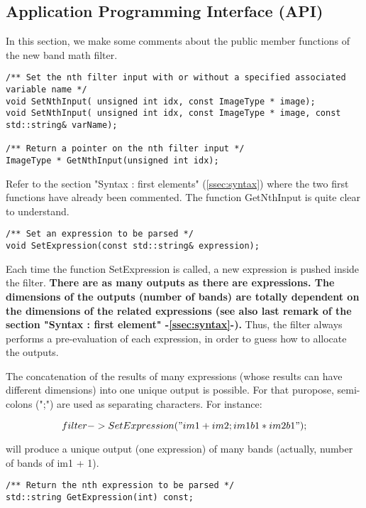\subsection{Application Programming Interface (API)}\label{ssec:API}

In this section, we make some comments about the public member functions of the new band math filter.

\begin{verbatim}
/** Set the nth filter input with or without a specified associated variable name */
void SetNthInput( unsigned int idx, const ImageType * image);
void SetNthInput( unsigned int idx, const ImageType * image, const std::string& varName);

/** Return a pointer on the nth filter input */
ImageType * GetNthInput(unsigned int idx);
\end{verbatim}

Refer to the section "Syntax : first elements" (\ref{ssec:syntax}) where the two first functions have already been commented. The function GetNthInput is quite clear to understand.

\begin{verbatim}
/** Set an expression to be parsed */
void SetExpression(const std::string& expression);
\end{verbatim}

Each time the function  SetExpression is called, a new expression is pushed inside the filter. \textbf{There are as many outputs as there are expressions. The dimensions of the outputs (number of bands) are totally dependent on the dimensions of the related expressions (see also last remark of the section "Syntax : first element" -\ref{ssec:syntax}-).} Thus, the filter always performs a pre-evaluation of each expression, in order to guess how to allocate the outputs.

The concatenation of the results of many expressions (whose results can have different dimensions) into one unique output is possible. For that puropose, semi-colons (";") are used as separating characters. For instance:


\begin{equation}
	filter->SetExpression("im1 + im2 ; im1b1*im2b1");
\end{equation}

will produce a unique output (one expression) of many bands (actually, number of bands of im1 + 1).

\begin{verbatim}
/** Return the nth expression to be parsed */
std::string GetExpression(int) const;
\end{verbatim}

